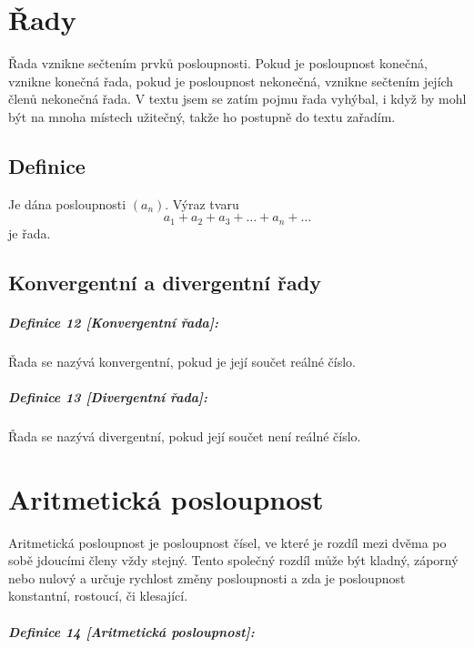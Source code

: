 \documentclass[12pt]{report}			%
\begin{document}
\chapter{Řady}

Řada vznikne sečtením prvků posloupnosti. Pokud je posloupnost konečná, vznikne konečná řada, pokud je posloupnost nekonečná, vznikne sečtením jejích členů nekonečná řada. V textu jsem se zatím pojmu řada vyhýbal, i když by mohl být na mnoha místech užitečný, takže ho postupně do textu zařadím.

\section{Definice}

Je dána posloupnosti $(a_n)$. Výraz tvaru
\begin{equation}
a_1 + a_2 + a_3 + \dots + a_n + \dots
\end{equation}
je řada.

\section{Konvergentní a divergentní řady}

\paragraph{Definice 12 [Konvergentní řada]:}
Řada se nazývá konvergentní, pokud je její součet reálné číslo. 
\paragraph{Definice 13 [Divergentní řada]:}
Řada se nazývá divergentní, pokud její součet není reálné číslo. 

\chapter{Aritmetická posloupnost}

Aritmetická posloupnost je posloupnost čísel, ve které je rozdíl mezi dvěma po sobě jdoucími členy vždy stejný. Tento společný rozdíl může být kladný, záporný nebo nulový a určuje rychlost změny posloupnosti a zda je posloupnost konstantní, rostoucí, či klesající.

\paragraph{Definice 14 [Aritmetická posloupnost]:}
\end{document}
